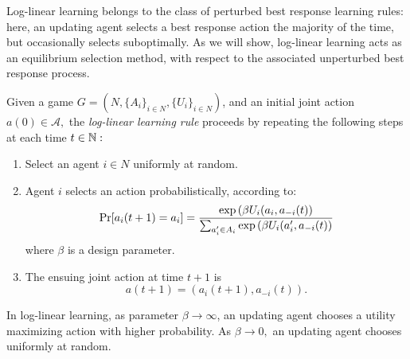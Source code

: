 
Log-linear learning belongs to the class of perturbed best response learning rules: here, an updating agent selects a best response action the majority of the time, but occasionally selects suboptimally. As we will show, log-linear learning acts as an equilibrium selection method, with respect to the associated unperturbed best response process.

\begin{defn}
Given a game $G = \left(N,\{A_i\}_{i\in N}, \{U_i\}_{i\in N}\right)$, and an initial joint action $a(0)\in\mathcal{A},$ the {\it log-linear learning rule} proceeds by repeating the following steps at each time $t\in \N:$
\begin{enumerate}
    \item Select an agent $i\in N$ uniformly at random.
    \item Agent $i$ selects an action probabilistically, according to:
    $$\Pr[a_i(t+1) = a_i] = {\exp\left(\beta U_i(a_i,a_{-i}(t)\right)\over
    \sum_{a_i^\prime\in A_i} \exp\left(\beta U_i(a_i^\prime,a_{-i}(t)\right)}$$ where $\beta$ is a design parameter.
    \item The ensuing joint action at time $t+1$ is $$a(t+1) = \left(a_i(t+1),a_{-i}(t)\right).$$
\end{enumerate}

\end{defn}

In log-linear learning, as parameter $\beta\to\infty$, an updating agent chooses a utility maximizing action with higher probability. As $\beta\to 0,$ an updating agent chooses uniformly at random. 







